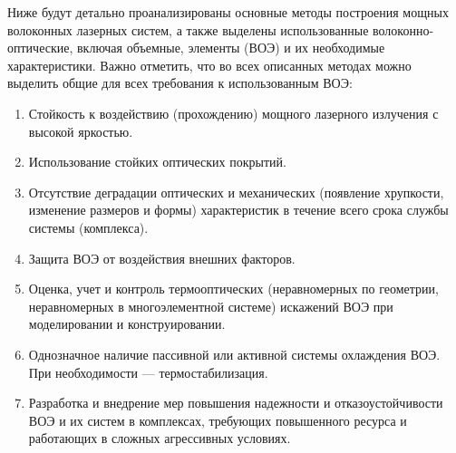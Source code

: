 Ниже будут детально проанализированы основные методы построения мощных волоконных лазерных систем, а также выделены использованные волоконно-оптические, включая объемные, элементы (ВОЭ) и их необходимые характеристики. Важно отметить, что во всех описанных методах можно выделить общие для всех требования к использованным ВОЭ:
\begin{enumerate}
  \item Стойкость к воздействию (прохождению) мощного лазерного излучения с высокой яркостью.
  \item Использование стойких оптических покрытий.
  \item Отсутствие деградации оптических и механических (появление хрупкости, изменение размеров и формы) характеристик в течение всего срока службы системы (комплекса).
  \item Защита ВОЭ от воздействия внешних факторов.
  \item Оценка, учет и контроль термооптических (неравномерных по геометрии, неравномерных в многоэлементной системе) искажений ВОЭ при моделировании и конструировании.
  \item Однозначное наличие пассивной или активной системы охлаждения ВОЭ. При необходимости --- термостабилизация.
  \item Разработка и внедрение мер повышения надежности и отказоустойчивости ВОЭ и их систем в комплексах, требующих повышенного ресурса и работающих в сложных агрессивных условиях.
\end{enumerate}


